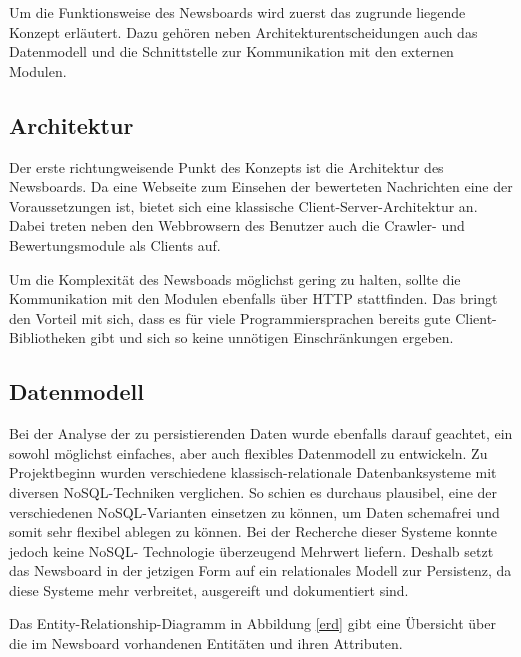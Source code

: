 Um die Funktionsweise des Newsboards wird zuerst das zugrunde liegende Konzept erläutert.
Dazu gehören neben Architekturentscheidungen auch das Datenmodell und die Schnittstelle
zur Kommunikation mit den externen Modulen.

\subsection{Architektur}
Der erste richtungweisende Punkt des Konzepts ist die Architektur des Newsboards.
Da eine Webseite zum Einsehen der bewerteten Nachrichten eine der Voraussetzungen ist,
bietet sich eine klassische Client-Server-Architektur an.
Dabei treten neben den Webbrowsern des Benutzer auch die Crawler-
und Bewertungsmodule als Clients auf.

Um die Komplexität des Newsboads möglichst gering zu halten, sollte die Kommunikation
mit den Modulen ebenfalls über HTTP stattfinden. Das bringt den Vorteil mit sich,
dass es für viele Programmiersprachen bereits gute Client-Bibliotheken gibt
und sich so keine unnötigen Einschränkungen ergeben.

\subsection{Datenmodell}
Bei der Analyse der zu persistierenden Daten wurde ebenfalls darauf geachtet, ein
sowohl möglichst einfaches, aber auch flexibles Datenmodell zu entwickeln. Zu Projektbeginn wurden verschiedene klassisch-relationale Datenbanksysteme mit diversen 
NoSQL-Techniken verglichen. So schien es durchaus plausibel, eine der verschiedenen
NoSQL-Varianten einsetzen zu können, um Daten schemafrei und somit sehr flexibel 
ablegen zu können. Bei der Recherche dieser Systeme konnte jedoch keine NoSQL-
Technologie überzeugend Mehrwert liefern. Deshalb setzt das Newsboard in der jetzigen Form 
auf ein relationales Modell zur Persistenz, da diese Systeme mehr
verbreitet, ausgereift und dokumentiert sind.

Das Entity-Relationship-Diagramm in Abbildung \ref{erd} gibt eine Übersicht über die im Newsboard
vorhandenen Entitäten und ihren Attributen.

